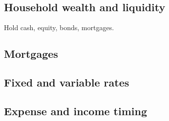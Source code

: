 
\subsection{Household wealth and liquidity}

Hold cash, equity, bonds, mortgages.

\subsection{Mortgages}

\subsection{Fixed and variable rates}

\subsection{Expense and income timing}


